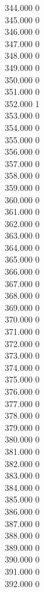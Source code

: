 { 344.000	0 \\
 345.000	0 \\
 346.000	0 \\
 347.000	0 \\
 348.000	0 \\
 349.000	0 \\
 350.000	0 \\
 351.000	0 \\
 352.000	1 \\
 353.000	0 \\
 354.000	0 \\
 355.000	0 \\
 356.000	0 \\
 357.000	0 \\
 358.000	0 \\
 359.000	0 \\
 360.000	0 \\
 361.000	0 \\
 362.000	0 \\
 363.000	0 \\
 364.000	0 \\
 365.000	0 \\
 366.000	0 \\
 367.000	0 \\
 368.000	0 \\
 369.000	0 \\
 370.000	0 \\
 371.000	0 \\
 372.000	0 \\
 373.000	0 \\
 374.000	0 \\
 375.000	0 \\
 376.000	0 \\
 377.000	0 \\
 378.000	0 \\
 379.000	0 \\
 380.000	0 \\
 381.000	0 \\
 382.000	0 \\
 383.000	0 \\
 384.000	0 \\
 385.000	0 \\
 386.000	0 \\
 387.000	0 \\
 388.000	0 \\
 389.000	0 \\
 390.000	0 \\
 391.000	0 \\
 392.000	0 \\
}
